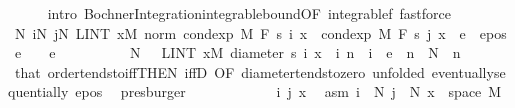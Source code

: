 \begin{isabellebody}
\ \ \ \ \isamarkupfalse%
\ {\isacharparenleft}{\kern0pt}intro\ Bochner{\isacharunderscore}{\kern0pt}Integration{\isachardot}{\kern0pt}integrable{\isacharunderscore}{\kern0pt}bound{\isacharbrackleft}{\kern0pt}OF\ integrable{\isacharunderscore}{\kern0pt}{}f{\isacharbrackright}{\kern0pt}{\isacharparenright}{\kern0pt}\ fastforce{\isacharplus}{\kern0pt}\isanewline
\isanewline
\ \ \isamarkupfalse%
\ {\isachardoublequoteopen}{\isasymexists}N{\isachardot}{\kern0pt}\ {\isasymforall}i{\isasymge}N{\isachardot}{\kern0pt}\ {\isasymforall}j{\isasymge}N{\isachardot}{\kern0pt}\ LINT\ x{\isacharbar}{\kern0pt}M{\isachardot}{\kern0pt}\ norm\ {\isacharparenleft}{\kern0pt}cond{\isacharunderscore}{\kern0pt}exp\ M\ F\ {\isacharparenleft}{\kern0pt}s\ i{\isacharparenright}{\kern0pt}\ x\ {\isacharminus}{\kern0pt}\ cond{\isacharunderscore}{\kern0pt}exp\ M\ F\ {\isacharparenleft}{\kern0pt}s\ j{\isacharparenright}{\kern0pt}\ x{\isacharparenright}{\kern0pt}\ {\isacharless}{\kern0pt}\ e{\isachardoublequoteclose}\ \ e{\isacharunderscore}{\kern0pt}pos{\isacharcolon}{\kern0pt}\ {\isachardoublequoteopen}e\ {\isachargreater}{\kern0pt}\ {}{\isachardoublequoteclose}\ \ e\isanewline
\ \ \isamarkupfalse%
\ {\isacharminus}{\kern0pt}\isanewline
\ \ \ \ \isamarkupfalse%
\ N\ \ {\isacharasterisk}{\kern0pt}{\isacharcolon}{\kern0pt}\ {\isachardoublequoteopen}LINT\ x{\isacharbar}{\kern0pt}M{\isachardot}{\kern0pt}\ diameter\ {\isacharbraceleft}{\kern0pt}s\ i\ x\ {\isacharbar}{\kern0pt}\ i{\isachardot}{\kern0pt}\ n\ {\isasymle}\ i{\isacharbraceright}{\kern0pt}\ {\isacharless}{\kern0pt}\ e{\isachardoublequoteclose}\ \ {\isachardoublequoteopen}n\ {\isasymge}\ N{\isachardoublequoteclose}\ \ n\ \isamarkupfalse%
\ that\ order{\isacharunderscore}{\kern0pt}tendsto{\isacharunderscore}{\kern0pt}iff{\isacharbrackleft}{\kern0pt}THEN\ iffD{}{\isacharcomma}{\kern0pt}\ OF\ diameter{\isacharunderscore}{\kern0pt}tendsto{\isacharunderscore}{\kern0pt}zero{\isacharcomma}{\kern0pt}\ unfolded\ eventually{\isacharunderscore}{\kern0pt}sequentially{\isacharbrackright}{\kern0pt}\ e{\isacharunderscore}{\kern0pt}pos\ \isamarkupfalse%
\ presburger\isanewline
\ \ \ \ \isacommand{{\isacharbraceleft}{\kern0pt}}\isamarkupfalse%
\isanewline
\ \ \ \ \ \ \isamarkupfalse%
\ i\ j\ x\ \isamarkupfalse%
\ asm{\isacharcolon}{\kern0pt}\ {\isachardoublequoteopen}i\ {\isasymge}\ N{\isachardoublequoteclose}\ {\isachardoublequoteopen}j\ {\isasymge}\ N{\isachardoublequoteclose}\ {\isachardoublequoteopen}x\ {\isasymin}\ space\ M{\isachardoublequoteclose}\isanewline

\end{isabellebody}
